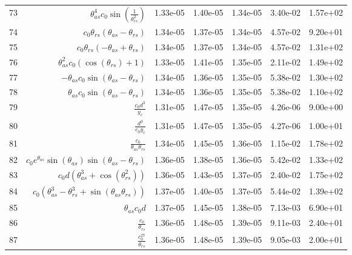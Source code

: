\begin{tabularx}{\textwidth}{lRRRRRl}
73  &  $ \theta_{as}^{4} c_{0} \sin{\left(\displaystyle\frac{1}{\theta_{rs}^{2}} \right)} $  &  1.33e-05  &  1.40e-05  &  1.34e-05  &  3.40e-02  &  1.57e+02  \\ 
74  &  $ c_{0} \theta_{rs} \left(\theta_{as} - \theta_{rs}\right) $  &  1.34e-05  &  1.37e-05  &  1.34e-05  &  4.57e-02  &  9.20e+01  \\ 
75  &  $ c_{0} \theta_{rs} \left(- \theta_{as} + \theta_{rs}\right) $  &  1.34e-05  &  1.37e-05  &  1.34e-05  &  4.57e-02  &  1.31e+02  \\ 
76  &  $ \theta_{as}^{2} c_{0} \left(\cos{\left(\theta_{rs} \right)} + 1\right) $  &  1.33e-05  &  1.41e-05  &  1.35e-05  &  2.11e-02  &  1.49e+02  \\ 
77  &  $ - \theta_{as} c_{0} \sin{\left(\theta_{as} - \theta_{rs} \right)} $  &  1.34e-05  &  1.36e-05  &  1.35e-05  &  5.38e-02  &  1.30e+02  \\ 
78  &  $ \theta_{as} c_{0} \sin{\left(\theta_{as} - \theta_{rs} \right)} $  &  1.34e-05  &  1.36e-05  &  1.35e-05  &  5.38e-02  &  1.10e+02  \\ 
79  &  $ \displaystyle\frac{c_{0} d^{3}}{y_c} $  &  1.31e-05  &  1.47e-05  &  1.35e-05  &  4.26e-06  &  9.00e+00  \\ 
80  &  $ \displaystyle\frac{d^{3}}{c_{0} y_c} $  &  1.31e-05  &  1.47e-05  &  1.35e-05  &  4.27e-06  &  1.00e+01  \\ 
81  &  $ \displaystyle\frac{c_{0}}{\theta_{as} \theta_{rs}} $  &  1.34e-05  &  1.45e-05  &  1.36e-05  &  1.15e-02  &  1.78e+02  \\ 
82  &  $ c_{0} e^{\theta_{as}} \sin{\left(\theta_{as} \right)} \sin{\left(\theta_{as} - \theta_{rs} \right)} $  &  1.36e-05  &  1.38e-05  &  1.36e-05  &  5.42e-02  &  1.33e+02  \\ 
83  &  $ c_{0} d \left(\theta_{as}^{3} + \cos{\left(\theta_{rs}^{2} \right)}\right) $  &  1.36e-05  &  1.43e-05  &  1.37e-05  &  2.40e-02  &  1.75e+02  \\ 
84  &  $ c_{0} \left(\theta_{as}^{3} - \theta_{rs}^{3} + \sin{\left(\theta_{as} \theta_{rs} \right)}\right) $  &  1.37e-05  &  1.40e-05  &  1.37e-05  &  5.44e-02  &  1.39e+02  \\ 
85  &  $ \theta_{as} c_{0} d $  &  1.37e-05  &  1.45e-05  &  1.38e-05  &  7.13e-03  &  6.90e+01  \\ 
86  &  $ \displaystyle\frac{c_{0}}{\theta_{rs}} $  &  1.36e-05  &  1.48e-05  &  1.39e-05  &  9.11e-03  &  2.40e+01  \\ 
87  &  $ \displaystyle\frac{c_{0}^{27}}{\theta_{rs}} $  &  1.36e-05  &  1.48e-05  &  1.39e-05  &  9.05e-03  &  2.00e+01  \\ 

\end{tabularx}
